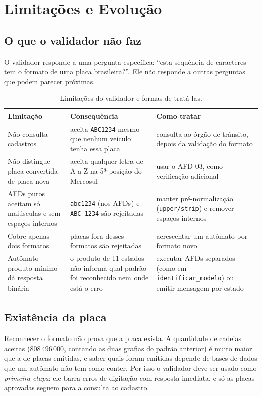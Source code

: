 \section{Limitações e Evolução}
\label{sec:limitacoes}

\subsection{O que o validador não faz}

O validador responde a uma pergunta específica: ``esta sequência de
caracteres tem o formato de uma placa brasileira?''. Ele não
responde a outras perguntas que podem parecer próximas.

\begin{table}[ht]
\centering
\small
\renewcommand{\arraystretch}{1.3}
\begin{tabular}{p{4.2cm} p{4.2cm} p{4.6cm}}
\toprule
Limitação & Consequência & Como tratar \\
\midrule
Não consulta cadastros
  & aceita \texttt{ABC1234} mesmo que nenhum veículo tenha essa placa
  & consulta ao órgão de trânsito, depois da validação do formato \\
Não distingue placa convertida de placa nova
  & aceita qualquer letra de A a Z na 5ª posição do Mercosul
  & usar o AFD 03, como verificação adicional \\
AFDs puros aceitam só maiúsculas e sem espaços internos
  & \texttt{abc1234} (nos AFDs) e \texttt{ABC 1234} são rejeitadas
  & manter pré-normalização (\texttt{upper/strip}) e remover espaços internos \\
Cobre apenas dois formatos
  & placas fora desses formatos são rejeitadas
  & acrescentar um autômato por formato novo \\
Autômato produto mínimo dá resposta binária
  & o produto de 11 estados não informa qual padrão foi reconhecido nem onde está o erro
  & executar AFDs separados (como em \texttt{identificar\_modelo}) ou emitir mensagem por estado \\
\bottomrule
\end{tabular}
\caption{Limitações do validador e formas de tratá-las.}
\label{tab:limitacoes}
\end{table}

\subsection{Existência da placa}

Reconhecer o formato não prova que a placa exista. A quantidade de
cadeias aceitas ($808\,496\,000$, contando as duas grafias do
padrão anterior) é muito maior que a de placas emitidas, e saber
quais foram emitidas depende de bases de dados que um autômato não
tem como conter. Por isso o validador deve ser usado como
\emph{primeira etapa}: ele barra erros de digitação com resposta
imediata, e só as placas aprovadas seguem para a consulta ao
cadastro.

